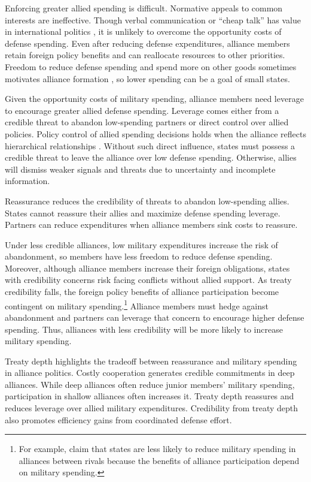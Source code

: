 \documentclass[12pt]{article}
\begin{document}
Enforcing greater allied spending is difficult. 
Normative appeals to common interests are ineffective. 
Though verbal communication or ``cheap talk'' has value in international politics \citep{Trager2010}, it is unlikely to overcome the opportunity costs of defense spending. 
Even after reducing defense expenditures, alliance members retain foreign policy benefits and can reallocate resources to other priorities. 
Freedom to reduce defense spending and spend more on other goods sometimes motivates alliance formation \citep{Kimball2010, AllenDigiuseppe2013}, so lower spending can be a goal of small states.


Given the opportunity costs of military spending, alliance members need leverage to encourage greater allied defense spending. 
Leverage comes either from a credible threat to abandon low-spending partners or direct control over allied policies. 
Policy control of allied spending decisions holds when the alliance reflects hierarchical relationships \citep{Lake1996}. 
Without such direct influence, states must possess a credible threat to leave the alliance over low defense spending. 
Otherwise, allies will dismiss weaker signals and threats due to uncertainty and incomplete information. 


Reassurance reduces the credibility of threats to abandon low-spending allies. 
States cannot reassure their allies and maximize defense spending leverage. 
Partners can reduce expenditures when alliance members sink costs to reassure. 


Under less credible alliances, low military expenditures increase the risk of abandonment, so members have less freedom to reduce defense spending. 
Moreover, although alliance members increase their foreign obligations, states with credibility concerns risk facing conflicts without allied support. 
As treaty credibility falls, the foreign policy benefits of alliance participation become contingent on military spending.\footnote{For example, \citep{NiouZeigler2019} claim that states are less likely to reduce military spending in alliances between rivals because the benefits of alliance participation depend on military spending.} 
Alliance members must hedge against abandonment and partners can leverage that concern to encourage higher defense spending.
Thus, alliances with less credibility will be more likely to increase military spending. 


Treaty depth highlights the tradeoff between reassurance and military spending in alliance politics.
Costly cooperation generates credible commitments in deep alliances. 
While deep alliances often reduce junior members' military spending, participation in shallow alliances often increases it. 
Treaty depth reassures and reduces leverage over allied military expenditures. 
Credibility from treaty depth also promotes efficiency gains from coordinated defense effort. 
\end{document}

